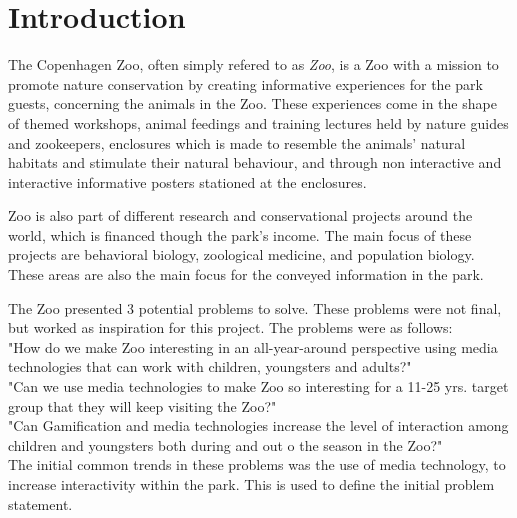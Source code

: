 \chapter{Introduction}

The Copenhagen Zoo, often simply refered to as \textit{Zoo}, is a Zoo with a mission to promote nature conservation by creating informative experiences for the park guests, concerning the animals in the Zoo. These experiences come in the shape of themed workshops, animal feedings and training lectures held by nature guides and zookeepers, enclosures which is made to resemble the animals' natural habitats and stimulate their natural behaviour, and through non interactive and interactive informative posters stationed at the enclosures. 

Zoo is also part of different research and conservational projects around the world, which is financed though the park's income. The main focus of these projects are behavioral biology, zoological medicine, and population biology. These areas are also the main focus for the conveyed information in the park.

The Zoo presented 3 potential problems to solve. These problems were not final, but worked as inspiration for this project. The problems were as follows: \\

"How do we make Zoo interesting in an all-year-around perspective using media technologies that can work with children, youngsters and adults?" \\

"Can we use media technologies to make Zoo so interesting for a 11-25 yrs. target group that they will keep visiting the Zoo?" \\

"Can Gamification and media technologies increase the level of interaction among children and youngsters both during and out o the season in the Zoo?" \\

The initial common trends in these problems was the use of media technology, to increase interactivity within the park. This is used to define the initial problem statement.\label{intro}


